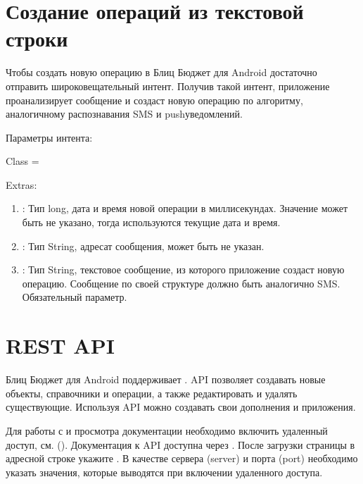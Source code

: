 \documentclass[a4paper,10pt,russian]{sphinxmanual}
\begin{document}
\section{Создание операций из текстовой строки}
\label{\detokenize{api:id2}}
\sphinxAtStartPar
Чтобы создать новую операцию в Блиц Бюджет для Android достаточно отправить широковещательный интент. Получив такой
интент, приложение проанализирует сообщение и создаст новую операцию по алгоритму, аналогичному распознавания SMS
и push\sphinxhyphen{}уведомлений.

\sphinxAtStartPar
Параметры интента:

\sphinxAtStartPar
Class = 

\sphinxAtStartPar
Extras:
\begin{enumerate}
%
\item {} 
\sphinxAtStartPar
{}: Тип long, дата и время новой операции в миллисекундах. Значение может быть не указано, тогда используются текущие дата и время.

\item {} 
\sphinxAtStartPar
{}: Тип String, адресат сообщения, может быть не указан.

\item {} 
\sphinxAtStartPar
{}: Тип String, текстовое сообщение, из которого приложение создаст новую операцию. Сообщение по своей структуре должно быть аналогично SMS. Обязательный параметр.

\end{enumerate}


\section{REST API}
\label{\detokenize{api:rest-api}}\label{\detokenize{api:sub-chapter-rest-api}}
\sphinxAtStartPar
Блиц Бюджет для Android поддерживает . API позволяет создавать новые объекты, справочники и операции, а также редактировать и удалять существующие. Используя API
можно создавать свои дополнения и приложения.

\sphinxAtStartPar
Для работы с  и просмотра документации необходимо включить удаленный доступ, см. {\hyperref[\detokenize{remote-access:chapter-remote-access}]{}} ().
Документация к API доступна через . После загрузки страницы в адресной строке  укажите .
В качестве сервера (server) и порта (port) необходимо указать значения, которые выводятся при включении удаленного доступа.
\end{document}

